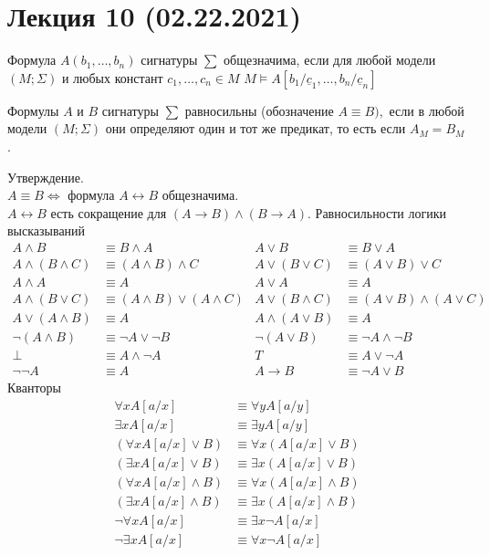 \section{Лекция 10 (02.22.2021)}

\begin{defn}
Формула $A\left(b_{1}, \ldots, b_{n}\right)$ сигнатуры $\sum$ общезначима, если для любой модели $(M ; \Sigma)$ и любых констант $c_{1}, \ldots, c_{n} \in M$ $M \vDash A\left[b_{1} / \underline{c}_{1}, \ldots, b_{n} / \underline{c}_{n}\right]$
\end{defn}

\begin{defn}
Формулы $A$ и $B$ сигнатуры $\sum$ равносильны (обозначение $A \equiv B),$ если в любой модели $(M ; \Sigma)$ они определяют один и тот же предикат, то есть если $A_{M}=B_{M}$.
\end{defn}

Утверждение.\\
$A \equiv B \Longleftrightarrow$ формула $A \leftrightarrow B$ общезначима.\\
$A \leftrightarrow B$ есть сокращение для $(A \rightarrow B) \wedge(B \rightarrow A) .$
\vskip 0.1in
Равносильности логики высказываний
$$
\begin{array}{rl|rl}
A \wedge B & \equiv B \wedge A & A \vee B & \equiv B \vee A \\
A \wedge(B \wedge C) & \equiv(A \wedge B) \wedge C & A \vee(B \vee C) & \equiv(A \vee B) \vee C \\
A \wedge A & \equiv A & A \vee A & \equiv A \\
A \wedge(B \vee C) & \equiv(A \wedge B) \vee(A \wedge C) & A \vee(B \wedge C) & \equiv(A \vee B) \wedge(A \vee C) \\
A \vee(A \wedge B) & \equiv A & A \wedge(A \vee B) & \equiv A \\
\neg(A \wedge B) & \equiv \neg A \vee \neg B & \neg(A \vee B) & \equiv \neg A \wedge \neg B \\
\perp & \equiv A \wedge \neg A & T & \equiv A \vee \neg A \\
\neg \neg A & \equiv A & A \rightarrow B & \equiv \neg A \vee B
\end{array}
$$
Кванторы
$$
\begin{aligned}
\forall x A[a / x] & \equiv \forall y A[a / y] \\
\exists x A[a / x] & \equiv \exists y A[a / y] \\
(\forall x A[a / x] \vee B) & \equiv \forall x(A[a / x] \vee B) \\
(\exists x A[a / x] \vee B) & \equiv \exists x(A[a / x] \vee B) \\
(\forall x A[a / x] \wedge B) & \equiv \forall x(A[a / x] \wedge B) \\
(\exists x A[a / x] \wedge B) & \equiv \exists x(A[a / x] \wedge B) \\
\neg \forall x A[a / x] & \equiv \exists x \neg A[a / x] \\
\neg \exists x A[a / x] & \equiv \forall x \neg A[a / x]
\end{aligned}
$$

